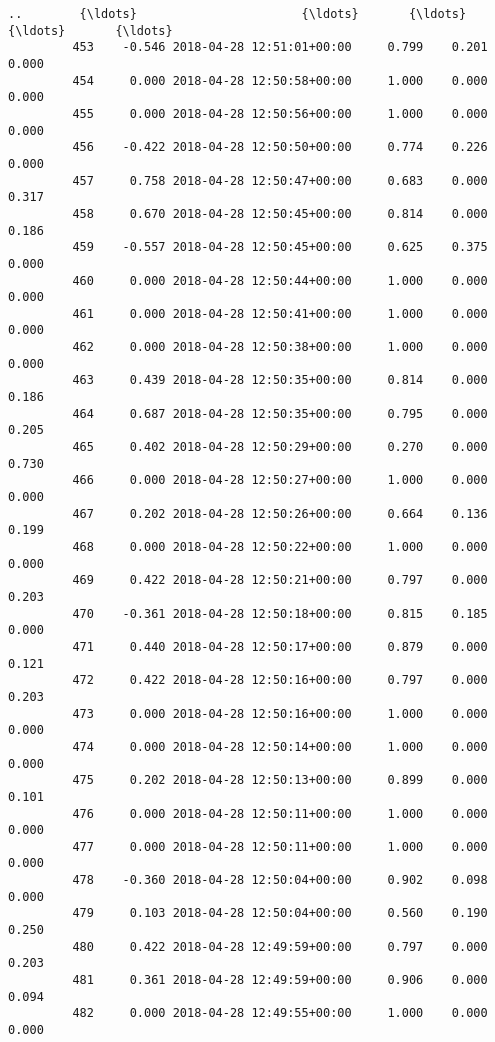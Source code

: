 \documentclass[11pt]{article}
\begin{document}
\begin{Verbatim}[commandchars=\\\{\}]
         ..        {\ldots}                       {\ldots}       {\ldots}      {\ldots}       {\ldots}   
         453    -0.546 2018-04-28 12:51:01+00:00     0.799    0.201     0.000   
         454     0.000 2018-04-28 12:50:58+00:00     1.000    0.000     0.000   
         455     0.000 2018-04-28 12:50:56+00:00     1.000    0.000     0.000   
         456    -0.422 2018-04-28 12:50:50+00:00     0.774    0.226     0.000   
         457     0.758 2018-04-28 12:50:47+00:00     0.683    0.000     0.317   
         458     0.670 2018-04-28 12:50:45+00:00     0.814    0.000     0.186   
         459    -0.557 2018-04-28 12:50:45+00:00     0.625    0.375     0.000   
         460     0.000 2018-04-28 12:50:44+00:00     1.000    0.000     0.000   
         461     0.000 2018-04-28 12:50:41+00:00     1.000    0.000     0.000   
         462     0.000 2018-04-28 12:50:38+00:00     1.000    0.000     0.000   
         463     0.439 2018-04-28 12:50:35+00:00     0.814    0.000     0.186   
         464     0.687 2018-04-28 12:50:35+00:00     0.795    0.000     0.205   
         465     0.402 2018-04-28 12:50:29+00:00     0.270    0.000     0.730   
         466     0.000 2018-04-28 12:50:27+00:00     1.000    0.000     0.000   
         467     0.202 2018-04-28 12:50:26+00:00     0.664    0.136     0.199   
         468     0.000 2018-04-28 12:50:22+00:00     1.000    0.000     0.000   
         469     0.422 2018-04-28 12:50:21+00:00     0.797    0.000     0.203   
         470    -0.361 2018-04-28 12:50:18+00:00     0.815    0.185     0.000   
         471     0.440 2018-04-28 12:50:17+00:00     0.879    0.000     0.121   
         472     0.422 2018-04-28 12:50:16+00:00     0.797    0.000     0.203   
         473     0.000 2018-04-28 12:50:16+00:00     1.000    0.000     0.000   
         474     0.000 2018-04-28 12:50:14+00:00     1.000    0.000     0.000   
         475     0.202 2018-04-28 12:50:13+00:00     0.899    0.000     0.101   
         476     0.000 2018-04-28 12:50:11+00:00     1.000    0.000     0.000   
         477     0.000 2018-04-28 12:50:11+00:00     1.000    0.000     0.000   
         478    -0.360 2018-04-28 12:50:04+00:00     0.902    0.098     0.000   
         479     0.103 2018-04-28 12:50:04+00:00     0.560    0.190     0.250   
         480     0.422 2018-04-28 12:49:59+00:00     0.797    0.000     0.203   
         481     0.361 2018-04-28 12:49:59+00:00     0.906    0.000     0.094   
         482     0.000 2018-04-28 12:49:55+00:00     1.000    0.000     0.000   
         

\end{Verbatim}
\end{document}
